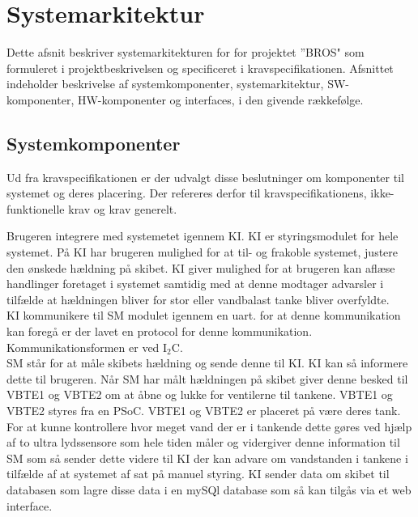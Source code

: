 \section{Systemarkitektur}
Dette afsnit beskriver systemarkitekturen for for projektet ”BROS" som formuleret i projektbeskrivelsen og specificeret i kravspecifikationen.
Afsnittet indeholder beskrivelse af systemkomponenter, systemarkitektur, SW-komponenter, HW-komponenter og interfaces, i den givende rækkefølge.

\subsection{Systemkomponenter}
Ud fra kravspecifikationen er der udvalgt disse beslutninger om komponenter til systemet og deres placering. Der refereres derfor til kravspecifikationens, ikke-funktionelle krav og krav generelt.

Brugeren integrere med systemetet igennem KI. KI er styringsmodulet for hele systemet. På KI har brugeren mulighed for at til- og frakoble systemet, justere den ønskede hældning på skibet. KI giver mulighed for at brugeren kan aflæse handlinger foretaget i systemet samtidig med at denne modtager advarsler i tilfælde at hældningen bliver for stor eller vandbalast tanke bliver overfyldte.\\
KI kommunikere til SM modulet igennem en uart. for at denne kommunikation kan foregå er der lavet en protocol for denne kommunikation. Kommunikationsformen er ved I$_2$C.\\
SM står for at måle skibets hældning og sende denne til KI. KI kan så informere dette til brugeren. Når SM har målt hældningen på skibet giver denne besked til VBTE1 og VBTE2 om at åbne og lukke for ventilerne til tankene. VBTE1 og VBTE2 styres fra en PSoC. VBTE1 og VBTE2 er placeret på være deres tank. For at kunne kontrollere hvor meget vand der er i tankende dette gøres ved hjælp af to ultra lydssensore som hele tiden måler og vidergiver denne information til SM som så sender dette videre til KI der kan advare om vandstanden i tankene i tilfælde af at systemet af sat på manuel styring.
KI sender data om skibet til databasen som lagre disse data i en mySQl database som så kan tilgås via et web interface.